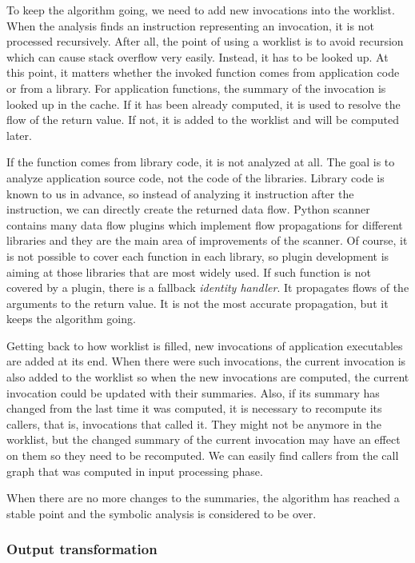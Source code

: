 To keep the algorithm going, we need to add new invocations into the worklist. When the analysis finds an instruction representing an invocation, it is not processed recursively. After all, the point of using a worklist is to avoid recursion which can cause stack overflow very easily. Instead, it has to be looked up. At this point, it matters whether the invoked function comes from application code or from a library. For application functions, the summary of the invocation is looked up in the cache. If it has been already computed, it is used to resolve the flow of the return value. If not, it is added to the worklist and will be computed later.
\par
If the function comes from library code, it is not analyzed at all. The goal is to analyze application source code, not the code of the libraries. Library code is known to us in advance, so instead of analyzing it instruction after the instruction, we can directly create the returned data flow. Python scanner contains many data flow plugins which implement flow propagations for different libraries and they are the main area of improvements of the scanner. Of course, it is not possible to cover each function in each library, so plugin development is aiming at those libraries that are most widely used. If such function is not covered by a plugin, there is a fallback \textit{identity handler}. It propagates flows of the arguments to the return value. It is not the most accurate propagation, but it keeps the algorithm going.
\par
Getting back to how worklist is filled, new invocations of application executables are added at its end. When there were such invocations, the current invocation is also added to the worklist so when the new invocations are computed, the current invocation could be updated with their summaries. Also, if its summary has changed from the last time it was computed, it is necessary to recompute its callers, that is, invocations that called it. They might not be anymore in the worklist, but the changed summary of the current invocation may have an effect on them so they need to be recomputed. We can easily find callers from the call graph that was computed in input processing phase.
\par
When there are no more changes to the summaries, the algorithm has reached a stable point and the symbolic analysis is considered to be over.

\subsubsection{Output transformation}

